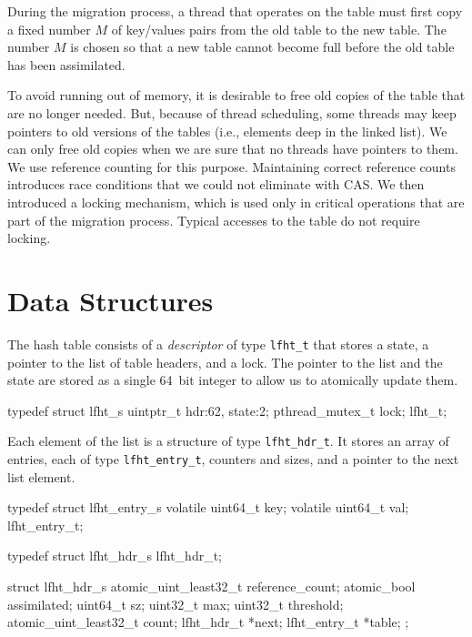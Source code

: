 During the migration process, a thread that operates on the table must
first copy a fixed number $M$ of key/values pairs from the old table
to the new table. The number $M$ is chosen so that a new table cannot
become full before the old table has been assimilated.

To avoid running out of memory, it is desirable to free old copies of
the table that are no longer needed. But, because of thread
scheduling, some threads may keep pointers to old versions of the
tables (i.e., elements deep in the linked list). We can only free old
copies when we are sure that no threads have pointers to them. We use
reference counting for this purpose. Maintaining correct reference
counts introduces race conditions that we could not eliminate with
CAS.  We then introduced a locking mechanism, which is used only in
critical operations that are part of the migration process. Typical
accesses to the table do not require locking.


\section{Data Structures}

The hash table consists of a {\em descriptor\/} of type
\texttt{lfht\_t} that stores a state, a pointer to the list of table
headers, and a lock.  The pointer to the list and the state are stored
as a single 64~bit integer to allow us to atomically update them.
\begin{center}
\begin{clisting}
typedef struct lfht_s {
  uintptr_t hdr:62, state:2;
  pthread_mutex_t lock;
} lfht_t;
\end{clisting}
\end{center}
Each
element of the list is a structure of type \texttt{lfht\_hdr\_t}. It
stores an array of entries, each of type \texttt{lfht\_entry\_t}, counters and sizes, and a pointer to the
next list element.
\begin{center}
\begin{clisting}
typedef struct lfht_entry_s {
  volatile uint64_t  key;
  volatile uint64_t  val;
} lfht_entry_t;

typedef struct lfht_hdr_s lfht_hdr_t;

struct lfht_hdr_s {
  atomic_uint_least32_t reference_count;
  atomic_bool assimilated;
  uint64_t sz;
  uint32_t max;
  uint32_t threshold;
  atomic_uint_least32_t count;
  lfht_hdr_t *next;
  lfht_entry_t *table;
};
\end{clisting}
\end{center}

